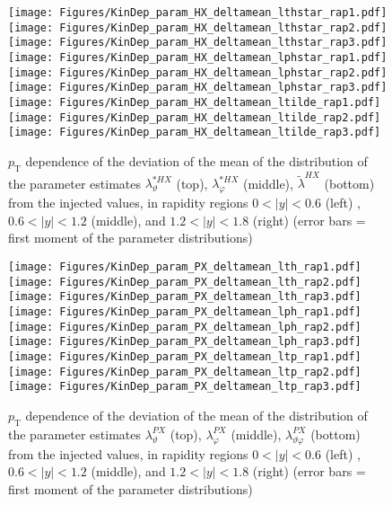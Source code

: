 \documentclass[12pt]{article}
\newcommand{\pT}{p_\mathrm{T}}
\newcommand{\absy}{\left |  y \right |}
\newcommand{\lamtildeHX}{\tilde{\lambda}^{\scriptscriptstyle HX}}
\newcommand{\lamthstarHX}{\lambda^{* \scriptscriptstyle HX}_\vartheta}
\newcommand{\lamphstarHX}{\lambda^{* \scriptscriptstyle HX}_\varphi}
\newcommand{\lamthPX}{\lambda^{\scriptscriptstyle PX}_\vartheta}
\newcommand{\lamphPX}{\lambda^{\scriptscriptstyle PX}_\varphi}
\newcommand{\lamthphPX}{\lambda^{\scriptscriptstyle PX}_{\vartheta \varphi}}
\begin{document}
\begin{figure}[htbp]
\centering
\texttt{[image: Figures/KinDep\_param\_HX\_deltamean\_lthstar\_rap1.pdf]}
\texttt{[image: Figures/KinDep\_param\_HX\_deltamean\_lthstar\_rap2.pdf]}
\texttt{[image: Figures/KinDep\_param\_HX\_deltamean\_lthstar\_rap3.pdf]}
\texttt{[image: Figures/KinDep\_param\_HX\_deltamean\_lphstar\_rap1.pdf]}
\texttt{[image: Figures/KinDep\_param\_HX\_deltamean\_lphstar\_rap2.pdf]}
\texttt{[image: Figures/KinDep\_param\_HX\_deltamean\_lphstar\_rap3.pdf]}
\texttt{[image: Figures/KinDep\_param\_HX\_deltamean\_ltilde\_rap1.pdf]}
\texttt{[image: Figures/KinDep\_param\_HX\_deltamean\_ltilde\_rap2.pdf]}
\texttt{[image: Figures/KinDep\_param\_HX\_deltamean\_ltilde\_rap3.pdf]}
\caption{$\pT$ dependence of the deviation of the mean of the distribution of
the parameter estimates $\lamthstarHX$ (top), $\lamphstarHX$ (middle),
$\lamtildeHX$ (bottom) from the injected values, in rapidity regions
$0<\absy<0.6$ (left) , $0.6<\absy<1.2$ (middle), and $1.2<\absy<1.8$ (right) (error bars = first moment of
the parameter distributions)}
\end{figure}
\clearpage











\begin{figure}[htbp]
\centering
\texttt{[image: Figures/KinDep\_param\_PX\_deltamean\_lth\_rap1.pdf]}
\texttt{[image: Figures/KinDep\_param\_PX\_deltamean\_lth\_rap2.pdf]}
\texttt{[image: Figures/KinDep\_param\_PX\_deltamean\_lth\_rap3.pdf]}
\texttt{[image: Figures/KinDep\_param\_PX\_deltamean\_lph\_rap1.pdf]}
\texttt{[image: Figures/KinDep\_param\_PX\_deltamean\_lph\_rap2.pdf]}
\texttt{[image: Figures/KinDep\_param\_PX\_deltamean\_lph\_rap3.pdf]}
\texttt{[image: Figures/KinDep\_param\_PX\_deltamean\_ltp\_rap1.pdf]}
\texttt{[image: Figures/KinDep\_param\_PX\_deltamean\_ltp\_rap2.pdf]}
\texttt{[image: Figures/KinDep\_param\_PX\_deltamean\_ltp\_rap3.pdf]}
\caption{$\pT$ dependence of the deviation of the mean of the distribution of
the parameter estimates $\lamthPX$ (top), $\lamphPX$ (middle), $\lamthphPX$
(bottom) from the injected values, in rapidity regions $0<\absy<0.6$ (left) ,
$0.6<\absy<1.2$ (middle), and $1.2<\absy<1.8$ (right) (error bars = first moment of the parameter
distributions)}
\end{figure}
\clearpage
\end{document}
